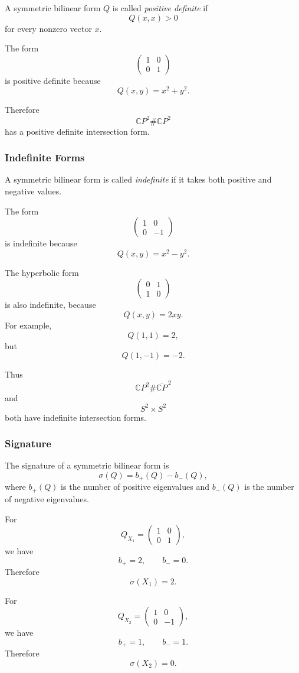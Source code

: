 \documentclass[12pt,a4paper]{article}
\theoremstyle{notespace}
\begin{document}
A symmetric bilinear form \(Q\) is called \emph{positive definite} if
\[
Q(x,x)>0
\]
for every nonzero vector \(x\).

The form
\[
\begin{pmatrix}
	1&0\\
	0&1
\end{pmatrix}
\]
is positive definite because
\[
Q(x,y)=x^2+y^2.
\]

Therefore
\[
\mathbb CP^2\#\mathbb CP^2
\]
has a positive definite intersection form.

\subsubsection{Indefinite Forms}

A symmetric bilinear form is called \emph{indefinite} if it takes both positive
and negative values.

The form
\[
\begin{pmatrix}
	1&0\\
	0&-1
\end{pmatrix}
\]
is indefinite because
\[
Q(x,y)=x^2-y^2.
\]

The hyperbolic form
\[
\begin{pmatrix}
	0&1\\
	1&0
\end{pmatrix}
\]
is also indefinite, because
\[
Q(x,y)=2xy.
\]
For example,
\[
Q(1,1)=2,
\]
but
\[
Q(1,-1)=-2.
\]

Thus
\[
\mathbb CP^2\#\overline{\mathbb CP}^{\,2}
\]
and
\[
S^2\times S^2
\]
both have indefinite intersection forms.

\subsubsection{Signature}

The signature of a symmetric bilinear form is
\[
\sigma(Q)=b_+(Q)-b_-(Q),
\]
where \(b_+(Q)\) is the number of positive eigenvalues and \(b_-(Q)\) is the
number of negative eigenvalues.

For
\[
Q_{X_1}
=
\begin{pmatrix}
	1&0\\
	0&1
\end{pmatrix},
\]
we have
\[
b_+=2,
\qquad
b_-=0.
\]
Therefore
\[
\sigma(X_1)=2.
\]

For
\[
Q_{X_2}
=
\begin{pmatrix}
	1&0\\
	0&-1
\end{pmatrix},
\]
we have
\[
b_+=1,
\qquad
b_-=1.
\]
Therefore
\[
\sigma(X_2)=0.
\]
\end{document}
